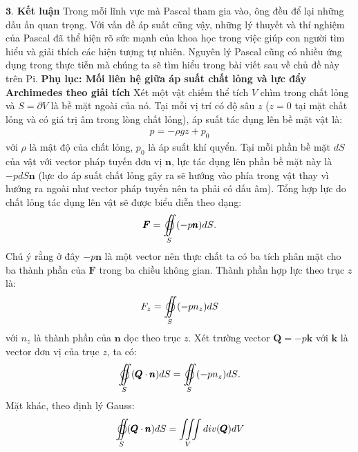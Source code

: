 \begin{multicols}{2}
	\vskip 0.1cm
	$\pmb{3.}$ \textbf{\color{timhieukhoahoc}Kết luận}
	\vskip 0.1cm
	Trong mỗi lĩnh vực mà Pascal tham gia vào, ông đều để lại những dấu ấn quan trọng. Với vấn đề áp suất cũng vậy, những lý  thuyết và thí nghiệm của Pascal đã thể hiện rõ sức mạnh của khoa học trong việc giúp con người tìm hiểu và giải thích các hiện tượng tự nhiên. Nguyên lý Pascal cũng có nhiều ứng dụng trong thực tiễn mà chúng ta sẽ tìm hiểu trong bài viết sau về chủ đề này trên Pi.
	\vskip 0.1cm
	\textbf{\color{timhieukhoahoc}Phụ lục: Mối liên hệ giữa áp suất chất lỏng và lực đẩy Archimedes theo giải tích}
	\vskip 0.1cm
	Xét một vật chiếm thể tích $V$ chìm trong chất lỏng và $S=\partial V$ là bề mặt ngoài của nó. Tại mỗi vị trí có độ sâu $z$ ($z=0$ tại mặt chất lỏng và có giá trị âm trong lòng chất lỏng), áp suất tác dụng lên bề mặt vật là:
	\begin{align*}
		p = - \rho gz + p_0
	\end{align*}
	với $\rho$ là mật độ của chất lỏng, $p_0$ là áp suất khí quyển.
	\vskip 0.1cm
	Tại mỗi phần bề mặt $dS$ của vật với vector pháp tuyến đơn vị $\pmb{n}$, lực tác dụng lên phần bề mặt này là $-p dS \pmb{n}$ (lực do áp suất chất lỏng gây ra sẽ hướng vào phía trong vật thay vì hướng ra ngoài như vector pháp tuyến nên ta phải có dấu âm). Tổng hợp lực do chất lỏng tác dụng lên vật sẽ được biểu diễn theo dạng:
	\begin{align*}
		\pmb{F} = \mathop{{\int\!\!\!\!\!\int}\mkern-21mu \bigcirc}\limits_S 
		{( - p\pmb{n})dS}.
	\end{align*}
	Chú ý rằng ở đây $-p\pmb{n}$ là một vector nên thực chất ta có ba tích phân mặt cho ba thành phần của $\pmb{F}$ trong ba chiều không gian.
	\vskip 0.1cm
	Thành phần hợp lực theo trục $z$ là:
	\begin{align*}
		{F_z} = \mathop{{\int\!\!\!\!\!\int}\mkern-21mu \bigcirc}\limits_S 
		{( - p{n_z}) dS}
	\end{align*}	
	với $n_z$ là thành phần của $\pmb{n}$ dọc theo trục $z$.
	\vskip 0.1cm
	Xét trường vector $\pmb{Q}=-p\pmb{k}$ với $\pmb{k}$ là vector đơn vị của trục $z$, ta có:
	\begin{align*}
		\mathop{{\int\!\!\!\!\!\int}\mkern-21mu \bigcirc}\limits_S 
		{(\pmb{Q} \cdot \pmb{n}) dS = \mathop{{\int\!\!\!\!\!\int}\mkern-21mu \bigcirc}\limits_S 
			{( - p{n_z}) dS} }.
	\end{align*}
	Mặt khác, theo định lý  Gauss:
	\begin{align*}
		&\mathop{{\int\!\!\!\!\!\int}\mkern-21mu \bigcirc}\limits_S 
		(\pmb{Q} \cdot \pmb{n}) dS = \iiint\limits_V div(\pmb{Q})dV \\

\end{align*}
\end{multicols}
